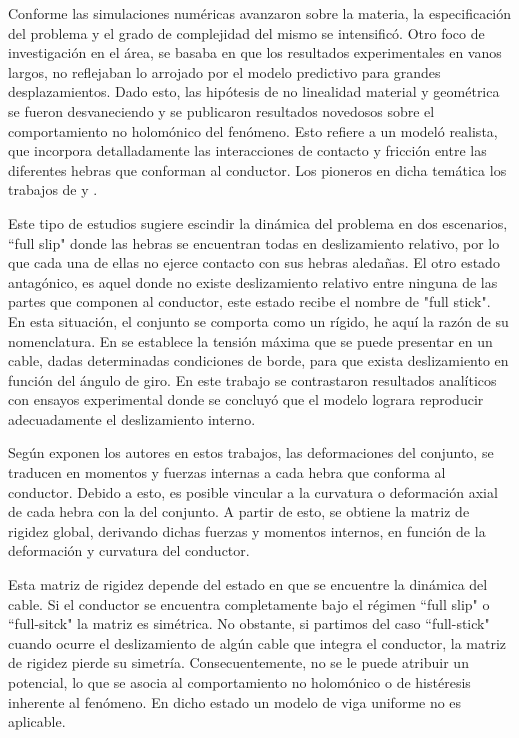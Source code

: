 Conforme las simulaciones numéricas avanzaron sobre la materia, la especificación del problema y el grado de complejidad del mismo se intensificó. Otro foco de investigación en el área, se basaba en que los resultados experimentales en vanos largos, no reflejaban lo arrojado por el modelo predictivo para grandes desplazamientos. Dado esto, las hipótesis de no linealidad material y geométrica se fueron desvaneciendo y se publicaron resultados novedosos sobre el comportamiento no holomónico del fenómeno. Esto refiere a un modeló realista, que incorpora detalladamente las interacciones de contacto y fricción entre las diferentes hebras que conforman al conductor. Los pioneros en dicha temática los trabajos de \cite {Papailiou1997} y \cite{Kutterer1992}.

Este tipo de estudios sugiere escindir la dinámica del problema en dos escenarios, ``full slip" donde las hebras se encuentran todas en deslizamiento relativo, por lo que cada una de ellas no ejerce contacto con sus hebras aledañas. El otro estado antagónico, es aquel donde no existe deslizamiento relativo entre ninguna de las partes que componen al conductor, este estado recibe el nombre de "full stick". En esta situación, el conjunto se comporta como un rígido, he aquí la razón de su nomenclatura. En \cite {Papailiou1997} se establece la tensión máxima que se puede presentar en un cable, dadas determinadas condiciones de borde, para que exista deslizamiento en función del ángulo de giro. En este trabajo se contrastaron resultados analíticos con ensayos experimental donde se concluyó que el modelo lograra reproducir adecuadamente el deslizamiento interno. 

Según exponen los autores en estos trabajos, las deformaciones del conjunto, se traducen en momentos y fuerzas internas a cada hebra que conforma al conductor. Debido a esto, es posible vincular a la curvatura o deformación axial de cada hebra con la del conjunto. A partir de esto, se obtiene la matriz de rigidez global, derivando dichas fuerzas y momentos internos, en función de la deformación y curvatura del conductor.

Esta matriz de rigidez depende del estado en que se encuentre la dinámica del cable. Si el conductor se encuentra completamente bajo el régimen ``full slip" o ``full-sitck" la matriz es simétrica. No obstante, si partimos del caso ``full-stick" cuando ocurre el deslizamiento de algún cable que integra el conductor, la matriz de rigidez pierde su simetría. Consecuentemente, no se le puede atribuir un potencial, lo que se asocia al comportamiento no holomónico o de histéresis inherente al fenómeno. En dicho estado un modelo de viga uniforme no es aplicable.


